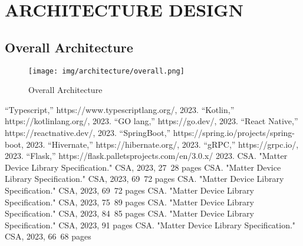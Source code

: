 \documentclass[conference]{IEEEtran}
\begin{document}
\section{ARCHITECTURE DESIGN}
\subsection{Overall Architecture}

\begin{figure}[h]
\centering   
\texttt{[image: img/architecture/overall.png]}
\caption{Overall Architecture}
\end{figure}

\clearpage




\begin{thebibliography}{9}
  “Typescript,” https://www.typescriptlang.org/, 2023.
  “Kotlin,” https://kotlinlang.org/, 2023.
  “GO lang,” https://go.dev/, 2023.
  “React Native,” https://reactnative.dev/, 2023.
  “SpringBoot,” https://spring.io/projects/spring-boot, 2023.
  “Hivernate,” https://hibernate.org/, 2023.
  “gRPC,” https://grpc.io/, 2023.
  “Flask,” https://flask.palletsprojects.com/en/3.0.x/ 2023.
 CSA. "Matter Device Library Specification." CSA, 2023, 27~28 pages
 CSA. "Matter Device Library Specification." CSA, 2023, 69~72 pages
 CSA. "Matter Device Library Specification." CSA, 2023, 69~72 pages
 CSA. "Matter Device Library Specification." CSA, 2023, 75~89 pages
 CSA. "Matter Device Library Specification." CSA, 2023, 84~85 pages
 CSA. "Matter Device Library Specification." CSA, 2023, 91 pages
 CSA. "Matter Device Library Specification." CSA, 2023, 66~68 pages

\end{thebibliography}
\end{document}
